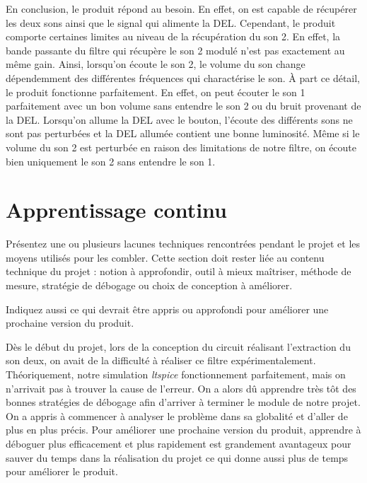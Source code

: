 \documentclass[11pt,letterpaper]{article}
\begin{document}
En conclusion, le produit répond au besoin. En effet, on est capable de récupérer les deux sons ainsi que le signal qui alimente la DEL. Cependant, le produit comporte certaines limites au niveau de 
la récupération du son 2. En effet, la bande passante du filtre qui récupère le son 2 modulé n'est pas exactement au même gain. Ainsi, lorsqu'on écoute le son 2, le volume du son change dépendemment des différentes
fréquences qui charactérise le son. À part ce détail, le produit fonctionne parfaitement. En effet, on peut écouter le son 1 parfaitement avec un bon volume sans entendre le son 2 ou du bruit provenant de la DEL. Lorsqu'on allume 
la DEL avec le bouton, l'écoute des différents sons ne sont pas perturbées et la DEL allumée contient une bonne luminosité. Même si le volume du son 2 est perturbée en raison des limitations de notre filtre, on écoute bien uniquement le son 2 
sans entendre le son 1. 
\clearpage
\section{Apprentissage continu}
Présentez une ou plusieurs lacunes techniques rencontrées pendant le projet et les moyens utilisés pour les combler. Cette section doit rester liée au contenu technique du projet : notion à approfondir, outil à mieux maîtriser, méthode de mesure, stratégie de débogage ou choix de conception à améliorer.

Indiquez aussi ce qui devrait être appris ou approfondi pour améliorer une prochaine version du produit. 

Dès le début du projet, lors de la conception du circuit réalisant l'extraction du son deux, on avait de la difficulté à réaliser ce filtre expérimentalement. Théoriquement, notre simulation \textit{ltspice} fonctionnement parfaitement, mais on n'arrivait pas à trouver la cause de l'erreur. On a alors dû apprendre très tôt des bonnes stratégies de débogage afin d'arriver à terminer le module de notre projet. On a appris à commencer à analyser le problème dans sa globalité et d'aller de plus en plus précis. Pour améliorer une prochaine version du produit, apprendre à déboguer plus efficacement et plus rapidement est grandement avantageux pour sauver du temps dans la réalisation du projet ce qui donne aussi plus de temps pour améliorer le produit.
\end{document}
